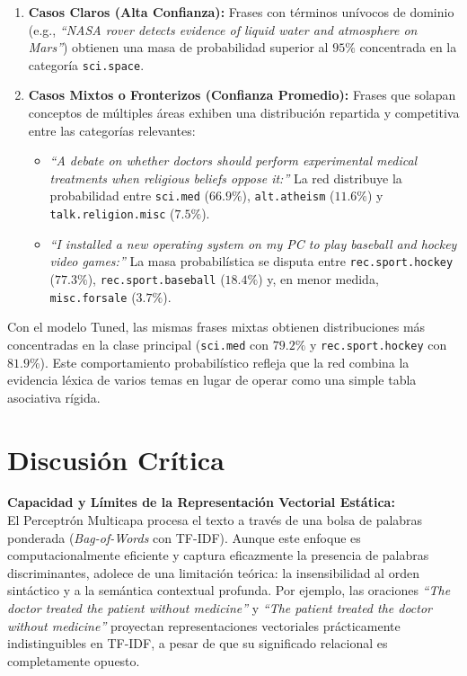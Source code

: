 \documentclass[12pt, a4paper]{article}
\begin{document}
\begin{enumerate}
    \item \textbf{Casos Claros (Alta Confianza):} Frases con términos unívocos de dominio (e.g., \textit{``NASA rover detects evidence of liquid water and atmosphere on Mars''}) obtienen una masa de probabilidad superior al $95\%$ concentrada en la categoría \texttt{sci.space}.
    \item \textbf{Casos Mixtos o Fronterizos (Confianza Promedio):} Frases que solapan conceptos de múltiples áreas exhiben una distribución repartida y competitiva entre las categorías relevantes:
    \begin{itemize}
        \item \textit{``A debate on whether doctors should perform experimental medical treatments when religious beliefs oppose it:''} La red distribuye la probabilidad entre \texttt{sci.med} ($66.9\%$), \texttt{alt.atheism} ($11.6\%$) y \texttt{talk.religion.misc} ($7.5\%$).
        \item \textit{``I installed a new operating system on my PC to play baseball and hockey video games:''} La masa probabilística se disputa entre \texttt{rec.sport.hockey} ($77.3\%$), \texttt{rec.sport.baseball} ($18.4\%$) y, en menor medida, \texttt{misc.forsale} ($3.7\%$).
    \end{itemize}
\end{enumerate}
Con el modelo Tuned, las mismas frases mixtas obtienen distribuciones más concentradas en la clase principal (\texttt{sci.med} con $79.2\%$ y \texttt{rec.sport.hockey} con $81.9\%$). Este comportamiento probabilístico refleja que la red combina la evidencia léxica de varios temas en lugar de operar como una simple tabla asociativa rígida.

\section{Discusión Crítica}

\textbf{Capacidad y Límites de la Representación Vectorial Estática:} \\
El Perceptrón Multicapa procesa el texto a través de una bolsa de palabras ponderada (\textit{Bag-of-Words} con TF-IDF). Aunque este enfoque es computacionalmente eficiente y captura eficazmente la presencia de palabras discriminantes, adolece de una limitación teórica: la insensibilidad al orden sintáctico y a la semántica contextual profunda. Por ejemplo, las oraciones \textit{``The doctor treated the patient without medicine''} y \textit{``The patient treated the doctor without medicine''} proyectan representaciones vectoriales prácticamente indistinguibles en TF-IDF, a pesar de que su significado relacional es completamente opuesto.
\end{document}
